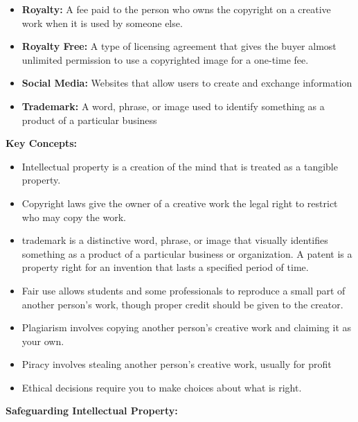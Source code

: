 \documentclass{report}
\begin{document}
\begin{itemize}
        \item \textbf{Royalty:} A fee paid to the person who owns the  copyright on a creative  work when it is used by someone else.
        \item \textbf{Royalty Free:} A type of licensing agreement that gives the buyer almost unlimited permission to use a copyrighted image for a one-time fee.
        \item \textbf{Social Media:} Websites that allow users to create and exchange information
        \item \textbf{Trademark:} A word, phrase, or image used to identify something as a product of a particular business
    \end{itemize}

    \pagebreak
    \begin{Large}
        \noindent \textbf{Key Concepts:}
    \end{Large}

    \bigbreak \noindent 
    \begin{itemize}
        \item Intellectual property is a creation of the mind that is treated as a tangible property. 
        \item Copyright laws give the owner of a creative work the legal right to restrict who may copy the work.
        \item trademark is a distinctive word, phrase, or image that visually identifies something as a product of a particular business or organization. A patent is a property right for an invention that lasts a specified period of time.
        \item Fair use allows students and some professionals to reproduce a small part of another person’s work, though proper credit should be given to the creator. 
        \item Plagiarism involves copying another person’s creative work and claiming it as your own. 
        \item Piracy involves stealing another person’s creative work, usually for profit 
        \item Ethical decisions require you to make choices about what is right.
    \end{itemize}

    \bigbreak \noindent \bigbreak \noindent \bigbreak \noindent 
    \begin{Large}
        \textbf{Safeguarding Intellectual Property:}
    \end{Large}
\end{document}
